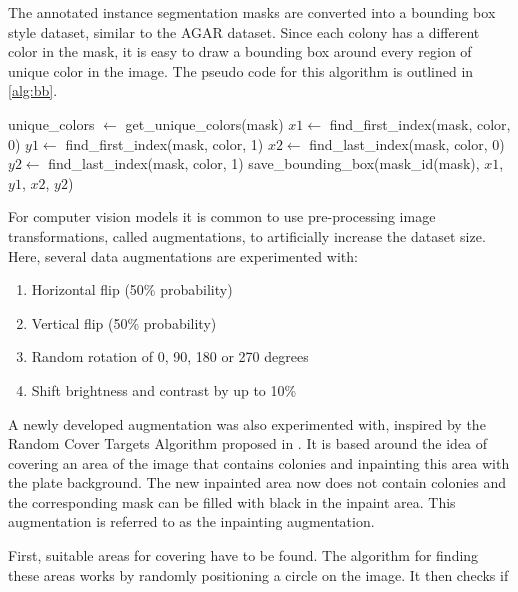 The annotated instance segmentation masks are converted into a bounding box style dataset, similar to the AGAR dataset. Since each colony has a different color in the mask, it is easy to draw a bounding box around every region of unique color in the image. The pseudo code for this algorithm is outlined in \ref{alg:bb}.

\begin{algorithm}
\caption{Convert instance segmentation masks to bounding boxes}
\begin{algorithmic}[1]
  \State unique\_colors $\gets$ get\_unique\_colors(mask)
    \State $x1 \gets$ find\_first\_index(mask, color, 0)
    \State $y1 \gets$ find\_first\_index(mask, color, 1)
    \State $x2 \gets$ find\_last\_index(mask, color, 0)
    \State $y2 \gets$ find\_last\_index(mask, color, 1)
    \State save\_bounding\_box(mask\_id(mask), $x1$, $y1$, $x2$, $y2$)
  \EndFor
\EndFor
\end{algorithmic}
\label{alg:bb}
\end{algorithm}

For computer vision models it is common to use pre-processing image transformations, called augmentations, to artificially increase the dataset size. Here, several data augmentations are experimented with:

\begin{enumerate}
	\item Horizontal flip (50\% probability)
	\item Vertical flip (50\% probability)
	\item Random rotation of 0, 90, 180 or 270 degrees
	\item Shift brightness and contrast by up to 10\%
\end{enumerate}
 
A newly developed augmentation was also experimented with, inspired by the Random Cover Targets Algorithm proposed in \citet{biology11020156}. It is based around the idea of covering an area of the image that contains colonies and inpainting this area with the plate background. The new inpainted area now does not contain colonies and the corresponding mask can be filled with black in the inpaint area. This augmentation is referred to as the inpainting augmentation.

First, suitable areas for covering have to be found. The algorithm for finding these areas works by randomly positioning a circle on the image. It then checks if

